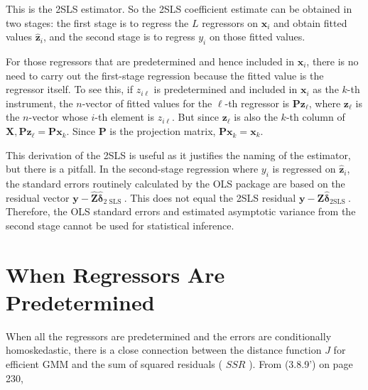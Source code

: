 \documentclass[10pt]{article}
\begin{document}
This is the 2SLS estimator. So the 2SLS coefficient estimate can be obtained in two stages: the first stage is to regress the $L$ regressors on $\mathbf{x}_{i}$ and obtain fitted values $\hat{\mathbf{z}}_{i}$, and the second stage is to regress $y_{i}$ on those fitted values.

For those regressors that are predetermined and hence included in $\mathbf{x}_{i}$, there is no need to carry out the first-stage regression because the fitted value is the regressor itself. To see this, if $z_{i \ell}$ is predetermined and included in $\mathbf{x}_{i}$ as the $k$-th instrument, the $n$-vector of fitted values for the $\ell$-th regressor is $\mathbf{P} \mathbf{z}_{\ell}$, where $\mathbf{z}_{\ell}$ is the $n$-vector whose $i$-th element is $z_{i \ell}$. But since $\mathbf{z}_{\ell}$ is also the $k$-th column of $\mathbf{X}, \mathbf{P z}_{\ell}=\mathbf{P x}_{k}$. Since $\mathbf{P}$ is the projection matrix, $\mathbf{P x}_{k}=\mathbf{x}_{k}$.

This derivation of the 2SLS is useful as it justifies the naming of the estimator, but there is a pitfall. In the second-stage regression where $y_{i}$ is regressed on $\hat{\mathbf{z}}_{i}$, the standard errors routinely calculated by the OLS package are based on the residual vector $\mathbf{y}-\widehat{\mathbf{Z}} \hat{\boldsymbol{\delta}}_{2 \text { SLS }}$. This does not equal the 2SLS residual $\mathbf{y}-\mathbf{Z} \hat{\boldsymbol{\delta}}_{\text {2SLS }}$. Therefore, the OLS standard errors and estimated asymptotic variance from the second stage cannot be used for statistical inference.

\section*{When Regressors Are Predetermined}
When all the regressors are predetermined and the errors are conditionally homoskedastic, there is a close connection between the distance function $J$ for efficient GMM and the sum of squared residuals ( $S S R$ ). From (3.8.9') on page 230,
\end{document}
